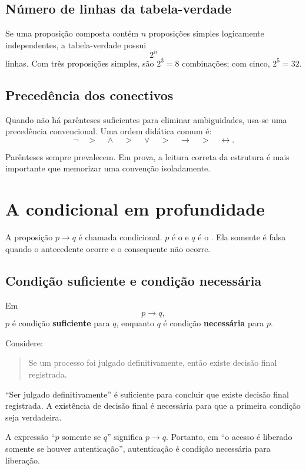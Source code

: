 \subsection{Número de linhas da tabela-verdade}

Se uma proposição composta contém $n$ proposições simples logicamente independentes, a tabela-verdade possui
\[
2^n
\]
linhas. Com três proposições simples, são $2^3=8$ combinações; com cinco, $2^5=32$.

\subsection{Precedência dos conectivos}

Quando não há parênteses suficientes para eliminar ambiguidades, usa-se uma precedência convencional. Uma ordem didática comum é:
\[
\neg \quad > \quad \land \quad > \quad \lor \quad > \quad \to \quad > \quad \leftrightarrow.
\]

Parênteses sempre prevalecem. Em prova, a leitura correta da estrutura é mais importante que memorizar uma convenção isoladamente.

\section{A condicional em profundidade}

A proposição $p\to q$ é chamada condicional. $p$ é o  e $q$ é o . Ela somente é falsa quando o antecedente ocorre e o consequente não ocorre.

\subsection{Condição suficiente e condição necessária}

Em
\[
p\to q,
\]
$p$ é condição \textbf{suficiente} para $q$, enquanto $q$ é condição \textbf{necessária} para $p$.

Considere:

\begin{quote}
Se um processo foi julgado definitivamente, então existe decisão final registrada.
\end{quote}

``Ser julgado definitivamente'' é suficiente para concluir que existe decisão final registrada. A existência de decisão final é necessária para que a primeira condição seja verdadeira.

\begin{atencao}[somente se]
A expressão ``$p$ somente se $q$'' significa $p\to q$. Portanto, em ``o acesso é liberado somente se houver autenticação'', autenticação é condição necessária para liberação.
\end{atencao}

